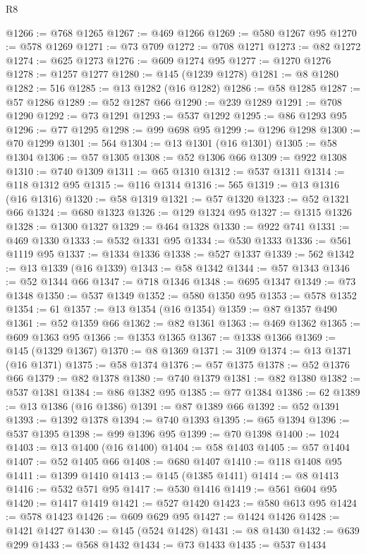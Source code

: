 \begin{lexlean}{R8}
\begin{coremodule}
@1266 := @768 @1265
@1267 := @469 @1266
@1269 := @580 @1267 @95
@1270 := @578 @1269
@1271 := @73 @709
@1272 := @708 @1271
@1273 := @82 @1272
@1274 := @625 @1273
@1276 := @609 @1274 @95
@1277 := @1270 @1276
@1278 := @1257 @1277
@1280 := @145 (@1239 @1278)
@1281 := @8 @1280
@1282 := 516
@1285 := @13 @1282 (@16 @1282)
@1286 := @58 @1285
@1287 := @57 @1286
@1289 := @52 @1287 @66
@1290 := @239 @1289
@1291 := @708 @1290
@1292 := @73 @1291
@1293 := @537 @1292
@1295 := @86 @1293 @95
@1296 := @77 @1295
@1298 := @99 @698 @95
@1299 := @1296 @1298
@1300 := @70 @1299
@1301 := 564
@1304 := @13 @1301 (@16 @1301)
@1305 := @58 @1304
@1306 := @57 @1305
@1308 := @52 @1306 @66
@1309 := @922 @1308
@1310 := @740 @1309
@1311 := @65 @1310
@1312 := @537 @1311
@1314 := @118 @1312 @95
@1315 := @116 @1314
@1316 := 565
@1319 := @13 @1316 (@16 @1316)
@1320 := @58 @1319
@1321 := @57 @1320
@1323 := @52 @1321 @66
@1324 := @680 @1323
@1326 := @129 @1324 @95
@1327 := @1315 @1326
@1328 := @1300 @1327
@1329 := @464 @1328
@1330 := @922 @741
@1331 := @469 @1330
@1333 := @532 @1331 @95
@1334 := @530 @1333
@1336 := @561 @1119 @95
@1337 := @1334 @1336
@1338 := @527 @1337
@1339 := 562
@1342 := @13 @1339 (@16 @1339)
@1343 := @58 @1342
@1344 := @57 @1343
@1346 := @52 @1344 @66
@1347 := @718 @1346
@1348 := @695 @1347
@1349 := @73 @1348
@1350 := @537 @1349
@1352 := @580 @1350 @95
@1353 := @578 @1352
@1354 := 61
@1357 := @13 @1354 (@16 @1354)
@1359 := @87 @1357 @490
@1361 := @52 @1359 @66
@1362 := @82 @1361
@1363 := @469 @1362
@1365 := @609 @1363 @95
@1366 := @1353 @1365
@1367 := @1338 @1366
@1369 := @145 (@1329 @1367)
@1370 := @8 @1369
@1371 := 3109
@1374 := @13 @1371 (@16 @1371)
@1375 := @58 @1374
@1376 := @57 @1375
@1378 := @52 @1376 @66
@1379 := @82 @1378
@1380 := @740 @1379
@1381 := @82 @1380
@1382 := @537 @1381
@1384 := @86 @1382 @95
@1385 := @77 @1384
@1386 := 62
@1389 := @13 @1386 (@16 @1386)
@1391 := @87 @1389 @66
@1392 := @52 @1391
@1393 := @1392 @1378
@1394 := @740 @1393
@1395 := @65 @1394
@1396 := @537 @1395
@1398 := @99 @1396 @95
@1399 := @70 @1398
@1400 := 1024
@1403 := @13 @1400 (@16 @1400)
@1404 := @58 @1403
@1405 := @57 @1404
@1407 := @52 @1405 @66
@1408 := @680 @1407
@1410 := @118 @1408 @95
@1411 := @1399 @1410
@1413 := @145 (@1385 @1411)
@1414 := @8 @1413
@1416 := @532 @571 @95
@1417 := @530 @1416
@1419 := @561 @604 @95
@1420 := @1417 @1419
@1421 := @527 @1420
@1423 := @580 @613 @95
@1424 := @578 @1423
@1426 := @609 @629 @95
@1427 := @1424 @1426
@1428 := @1421 @1427
@1430 := @145 (@524 @1428)
@1431 := @8 @1430
@1432 := @639 @299
@1433 := @568 @1432
@1434 := @73 @1433
@1435 := @537 @1434

\end{coremodule}
\end{lexlean}
